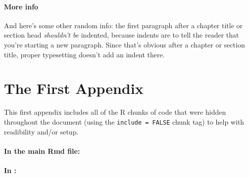 \documentclass[12pt,twoside]{reedthesis}
\begin{document}
  \subsubsection{More info}\label{more-info}
  
  And here's some other random info: the first paragraph after a chapter
  title or section head \emph{shouldn't be} indented, because indents are
  to tell the reader that you're starting a new paragraph. Since that's
  obvious after a chapter or section title, proper typesetting doesn't add
  an indent there.
  
  \appendix
  
  \chapter{The First Appendix}\label{the-first-appendix}
  
  This first appendix includes all of the R chunks of code that were
  hidden throughout the document (using the \texttt{include\ =\ FALSE}
  chunk tag) to help with readibility and/or setup.
  
  \subsubsection{In the main Rmd file:}\label{in-the-main-rmd-file}
  
  \begin{Shaded}
  \begin{Highlighting}[]
  \NormalTok{(}\OperatorTok{!}
    \NormalTok{(}\NormalTok{, } \NormalTok{)}
  \NormalTok{(}\OperatorTok{!}
  \OperatorTok{::}\NormalTok{(}\NormalTok{)}
  \NormalTok{\}}
  \end{Highlighting}
  \end{Shaded}
  
  \subsubsection{\texorpdfstring{In
  \protect\hyperlink{ref_labels}{}:}{In :}}\label{in}
  
\end{document}
